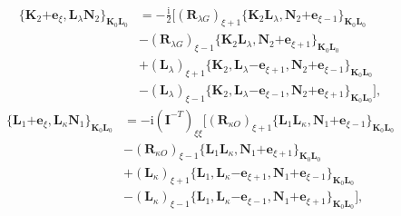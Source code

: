 \documentclass[a4paper,11pt,twoside,openright]{book}
\begin{document}
%
\begin{align}
  \label{eq:recurrence-mag-ket}
  \{\boldsymbol{K}_{2}\mathrm{+}\boldsymbol{e}_{\xi},%
    \boldsymbol{L}_{\lambda}\boldsymbol{N}_{2}\}_{\boldsymbol{K}_{0}\boldsymbol{L}_{0}}
  &=-\tfrac{\text{i}}{2}\bigl[(\boldsymbol{R}_{\lambda G})_{\xi+1}%
    \{\boldsymbol{K}_{2}\boldsymbol{L}_{\lambda},%
      \boldsymbol{N}_{2}\mathrm{+}\boldsymbol{e}_{\xi-1}\}_{\boldsymbol{K}_{0}\boldsymbol{L}_{0}}\\
  &-(\boldsymbol{R}_{\lambda G})_{\xi-1}%
    \{\boldsymbol{K}_{2}\boldsymbol{L}_{\lambda},%
      \boldsymbol{N}_{2}\mathrm{+}\boldsymbol{e}_{\xi+1}\}_{\boldsymbol{K}_{0}\boldsymbol{L}_{0}}\nonumber\\
  &+(\boldsymbol{L}_{\lambda})_{\xi+1}%
    \{\boldsymbol{K}_{2},\boldsymbol{L}_{\lambda}\mathrm{-}\boldsymbol{e}_{\xi+1},%
      \boldsymbol{N}_{2}\mathrm{+}\boldsymbol{e}_{\xi-1}\}_{\boldsymbol{K}_{0}\boldsymbol{L}_{0}}\nonumber\\
  &-(\boldsymbol{L}_{\lambda})_{\xi-1}%
    \{\boldsymbol{K}_{2},\boldsymbol{L}_{\lambda}\mathrm{-}\boldsymbol{e}_{\xi-1},%
      \boldsymbol{N}_{2}\mathrm{+}\boldsymbol{e}_{\xi+1}\}_{\boldsymbol{K}_{0}\boldsymbol{L}_{0}}\bigr],\nonumber
\end{align}
%
\begin{align}
  \label{eq:recurrence-angular-bra}
    \{\boldsymbol{L}_{1}\mathrm{+}\boldsymbol{e}_{\xi},%
    \boldsymbol{L}_{\kappa}\boldsymbol{N}_{1}\}_{\boldsymbol{K}_{0}\boldsymbol{L}_{0}}
  &=-\text{i}\left(\mathbf{I}^{-T}\right)_{\xi\xi}\bigl[(\boldsymbol{R}_{\kappa O})_{\xi+1}%
    \{\boldsymbol{L}_{1}\boldsymbol{L}_{\kappa},%
      \boldsymbol{N}_{1}\mathrm{+}\boldsymbol{e}_{\xi-1}\}_{\boldsymbol{K}_{0}\boldsymbol{L}_{0}}\\
  &-(\boldsymbol{R}_{\kappa O})_{\xi-1}%
    \{\boldsymbol{L}_{1}\boldsymbol{L}_{\kappa},%
      \boldsymbol{N}_{1}\mathrm{+}\boldsymbol{e}_{\xi+1}\}_{\boldsymbol{K}_{0}\boldsymbol{L}_{0}}\nonumber\\
  &+(\boldsymbol{L}_{\kappa})_{\xi+1}%
    \{\boldsymbol{L}_{1},\boldsymbol{L}_{\kappa}\mathrm{-}\boldsymbol{e}_{\xi+1},%
      \boldsymbol{N}_{1}\mathrm{+}\boldsymbol{e}_{\xi-1}\}_{\boldsymbol{K}_{0}\boldsymbol{L}_{0}}\nonumber\\
  &-(\boldsymbol{L}_{\kappa})_{\xi-1}%
    \{\boldsymbol{L}_{1},\boldsymbol{L}_{\kappa}\mathrm{-}\boldsymbol{e}_{\xi-1},%
      \boldsymbol{N}_{1}\mathrm{+}\boldsymbol{e}_{\xi+1}\}_{\boldsymbol{K}_{0}\boldsymbol{L}_{0}}\bigr],\nonumber
\end{align}
\end{document}
